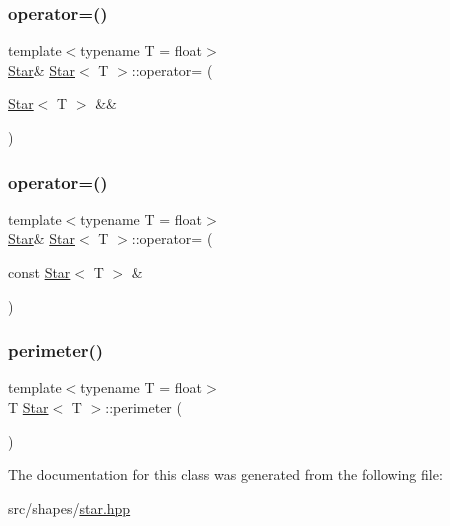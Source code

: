 \mbox{\label{classStar_a7113d2808314f0aa2f5a87325f8c535d}} 
\subsubsection{\texorpdfstring{operator=()}{operator=()}\hspace{0.1cm}{\footnotesize\ttfamily [1/2]}}
{\footnotesize\ttfamily template$<$typename T  = float$>$ \\
\mbox{\hyperlink{classStar}{Star}}\& \mbox{\hyperlink{classStar}{Star}}$<$ T $>$\+::operator= (\begin{DoxyParamCaption}\item[{\mbox{\hyperlink{classStar}{Star}}$<$ T $>$ \&\&}]{ }\end{DoxyParamCaption})\hspace{0.3cm}{\ttfamily [default]}}

\mbox{\label{classStar_a3507f157448e082ccfcadc4783f2610e}} 
\subsubsection{\texorpdfstring{operator=()}{operator=()}\hspace{0.1cm}{\footnotesize\ttfamily [2/2]}}
{\footnotesize\ttfamily template$<$typename T  = float$>$ \\
\mbox{\hyperlink{classStar}{Star}}\& \mbox{\hyperlink{classStar}{Star}}$<$ T $>$\+::operator= (\begin{DoxyParamCaption}\item[{const \mbox{\hyperlink{classStar}{Star}}$<$ T $>$ \&}]{ }\end{DoxyParamCaption})\hspace{0.3cm}{\ttfamily [default]}}

\mbox{\label{classStar_a908253192d0b1fe95aeeaa81322545bf}} 
\subsubsection{\texorpdfstring{perimeter()}{perimeter()}}
{\footnotesize\ttfamily template$<$typename T  = float$>$ \\
T \mbox{\hyperlink{classStar}{Star}}$<$ T $>$\+::perimeter (\begin{DoxyParamCaption}{ }\end{DoxyParamCaption})}



The documentation for this class was generated from the following file\+:\begin{DoxyCompactItemize}
\item 
src/shapes/\mbox{\hyperlink{star_8hpp}{star.\+hpp}}\end{DoxyCompactItemize}
